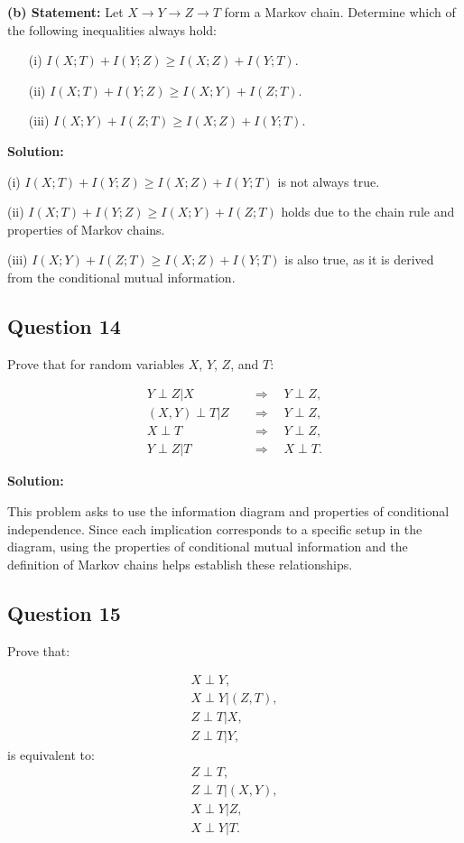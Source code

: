 \documentclass[a4paper,10pt]{article}
\begin{document}
\textbf{(b) Statement:} Let $ X \to Y \to Z \to T $ form a Markov chain. Determine which of the following inequalities always hold:
\begin{itemize}
    \item[(i)] $ I(X; T) + I(Y; Z) \geq I(X; Z) + I(Y; T) $.
    \item[(ii)] $ I(X; T) + I(Y; Z) \geq I(X; Y) + I(Z; T) $.
    \item[(iii)] $ I(X; Y) + I(Z; T) \geq I(X; Z) + I(Y; T) $.
\end{itemize}

\textbf{Solution:}

(i) $ I(X; T) + I(Y; Z) \geq I(X; Z) + I(Y; T) $ is not always true.

(ii) $ I(X; T) + I(Y; Z) \geq I(X; Y) + I(Z; T) $ holds due to the chain rule and properties of Markov chains.

(iii) $ I(X; Y) + I(Z; T) \geq I(X; Z) + I(Y; T) $ is also true, as it is derived from the conditional mutual information.

\subsection*{Question 14}
Prove that for random variables $ X $, $ Y $, $ Z $, and $ T $:

$$
\begin{aligned}
Y \perp Z | X \quad &\Rightarrow \quad Y \perp Z, \\
(X, Y) \perp T | Z \quad &\Rightarrow \quad Y \perp Z, \\
X \perp T \quad &\Rightarrow \quad Y \perp Z, \\
Y \perp Z | T \quad &\Rightarrow \quad X \perp T.
\end{aligned}
$$

\textbf{Solution:}

This problem asks to use the information diagram and properties of conditional independence. Since each implication corresponds to a specific setup in the diagram, using the properties of conditional mutual information and the definition of Markov chains helps establish these relationships.

\subsection*{Question 15}
Prove that:

$$
\begin{aligned}
X \perp Y, \\
X \perp Y | (Z, T), \\
Z \perp T | X, \\
Z \perp T | Y,
\end{aligned}
$$
is equivalent to:
$$
\begin{aligned}
Z \perp T, \\
Z \perp T | (X, Y), \\
X \perp Y | Z, \\
X \perp Y | T.
\end{aligned}
$$
\end{document}
